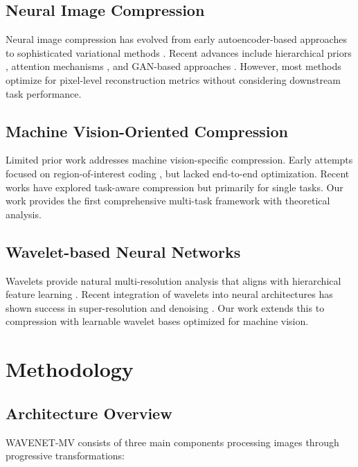 \documentclass[conference]{IEEEtran}
\begin{document}
\subsection{Neural Image Compression}

Neural image compression has evolved from early autoencoder-based approaches \cite{balle2016end} to sophisticated variational methods \cite{balle2018variational}. Recent advances include hierarchical priors \cite{minnen2018joint}, attention mechanisms \cite{cheng2020learned}, and GAN-based approaches \cite{agustsson2019generative}. However, most methods optimize for pixel-level reconstruction metrics without considering downstream task performance.

\subsection{Machine Vision-Oriented Compression}

Limited prior work addresses machine vision-specific compression. Early attempts focused on region-of-interest coding \cite{christopoulos2000jpeg2000}, but lacked end-to-end optimization. Recent works \cite{choi2022scalable, singh2020end} have explored task-aware compression but primarily for single tasks. Our work provides the first comprehensive multi-task framework with theoretical analysis.

\subsection{Wavelet-based Neural Networks}

Wavelets provide natural multi-resolution analysis that aligns with hierarchical feature learning \cite{liu2018multi, huang2017wavelet}. Recent integration of wavelets into neural architectures has shown success in super-resolution \cite{huang2017wavelet} and denoising \cite{liu2018multi}. Our work extends this to compression with learnable wavelet bases optimized for machine vision.

\section{Methodology}

\subsection{Architecture Overview}

WAVENET-MV consists of three main components processing images through progressive transformations:
\end{document}
